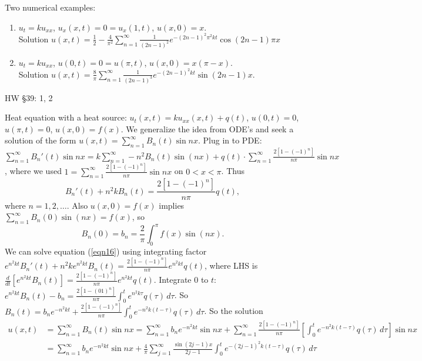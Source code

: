 \documentclass[]{article}
\begin{document}
\begin{example}
	Two numerical examples:
	\begin{enumerate}
		\item $u_t = ku_{xx}$, $u_x(x,t) = 0 = u_x(1,t)$, $u(x,0)=x$. \\Solution $u(x,t) = \frac{1}{2} - \frac{4}{\pi^2} \sum_{n=1}^\infty \frac{1}{(2n-1)^2} e^{-(2n-1)^2\pi^2 kt} \cos{(2n-1)\pi x}$
		\item $u_t = ku_{xx}$, $u(0,t) = 0 = u(\pi,t)$, $u(x,0) = x(\pi-x)$. \\Solution $u(x,t) = \frac{8}{\pi} \sum_{n=1}^\infty \frac{1}{(2n-1)^3} e^{-(2n-1)^2 kt} \sin{(2n-1)x}$.
	\end{enumerate}
\end{example}
HW \S39: 1, 2

\begin{example}
	Heat equation with a heat source:
	$u_t(x,t) = ku_{xx}(x,t) + q(t)$, $u(0,t) = 0$, $u(\pi,t) = 0$, $u(x,0)=f(x)$.
	We generalize the  idea from ODE's and seek a solution of the form $u(x,t) = \sum_{n=1}^\infty B_n(t) \sin{nx}$.
	Plug in to PDE: $\sum_{n=1}^\infty B_n'(t) \sin{nx} = k \sum_{n=1}^\infty -n^2 B_n(t) \sin{(nx)} + q(t) \cdot \sum_{n=1}^\infty \frac{2[1-(-1)^n]}{n\pi} \sin{nx}$, where we used $ 1= \sum_{n=1}^\infty \frac{2[1-(-1)^n]}{n\pi} \sin{nx}$ on $0<x<\pi$.
	Thus \begin{equation}
		B_n'(t) + n^2kB_n(t) = \frac{2[1-(-1)^n]}{n\pi}q(t),
		\label{eqn16}
	\end{equation} where $n=1,2,\dots$.
	Also $u(x,0) = f(x)$ implies $\sum_{n=1}^\infty B_n(0) \sin{(nx)} = f(x)$, so $$B_n(0) = b_n = \frac{2}{\pi} \int_0^\pi f(x) \sin{(nx)}.$$
	We can solve equation (\ref{eqn16}) using integrating factor $e^{n^2kt} B_n'(t) + n^2ke^{n^2kt} B_n(t) = \frac{2[1-(-1)^n]}{n\pi}e^{n^2kt} q(t)$, where LHS is $\frac{d}{dt} \left[ e^{n^2kt} B_n(t) \right] = \frac{2[1-(-1)^n]}{n\pi} e^{n^2kt} q(t)$. 
	Integrate 0 to $t$: $e^{n^2kt} B_n(t) - b_n = \frac{2[1-(01)^n]}{n\pi} \int_0^t e^{n^2k\tau} q(\tau) \, d\tau$. So $B_n(t) = b_n e^{-n^2kt} + \frac{2[1-(-1)^n]}{n\pi} \int_0^t e^{-n^2k(t-\tau)}q(\tau) \, d\tau$.
	So the solution
	\begin{align*}
		u(x,t) &= \sum_{n=1}^\infty B_n(t) \sin{nx} = \sum_{n=1}^\infty b_n e^{-n^2kt} \sin{nx} + \sum_{n=1}^\infty \frac{2[1-(-1)^n]}{n\pi} \left[ \int_0^t e^{-n^2k(t-\tau)} q(\tau) \, d\tau \right] \sin{nx} \\
		&=\sum_{n=1}^\infty b_n e^{-n^2kt} \sin{nx} + \frac{4}{\pi} \sum_{j=1}^\infty \frac{\sin{(2j-1)x}}{2j-1} \int_0^t e^{-(2j-1)^2k(t-\tau)} q(\tau) \, d\tau
	\end{align*}
\end{example}
\end{document}
